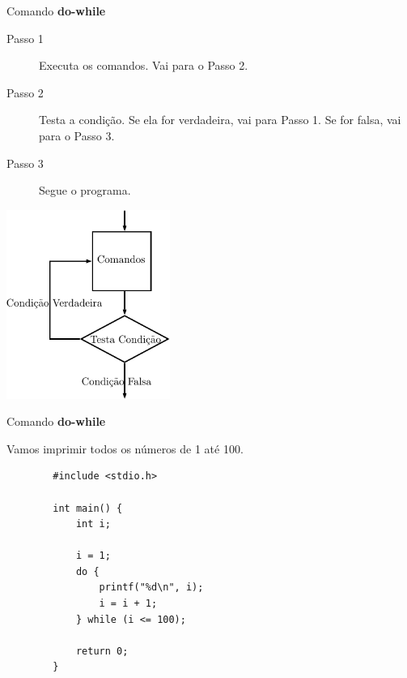 \documentclass[handout]{beamer}
\begin{document}
\begin{frame}[fragile]{Comando {\bf do-while}}

    \begin{description}
        \item[Passo 1] Executa os comandos. Vai para o Passo 2.
        \item[Passo 2] Testa a condição. Se ela for verdadeira, vai para Passo 1. Se for falsa, vai para o Passo 3.
        \item[Passo 3] Segue o programa.
    \end{description}

    \begin{center}
        \includegraphics[width=0.4\textwidth]{figs/do-while}
    \end{center}
\end{frame}

\begin{frame}[fragile]{Comando {\bf do-while}}

    Vamos imprimir todos os números de 1 até 100.

    \begin{verbatim}
        #include <stdio.h>

        int main() {
            int i;

            i = 1;
            do {
                printf("%d\n", i);
                i = i + 1;
            } while (i <= 100);

            return 0;
        }
    \end{verbatim}
\end{frame}
\end{document}
